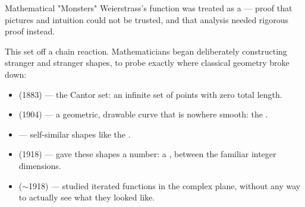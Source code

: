 \begin{frame}{Mathematical "Monsters"}
  \small
  Weierstrass's function was treated as a  — proof that pictures and intuition could not be trusted,
  and that analysis needed rigorous proof instead.

  \vspace{0.2cm}
  \pause
  This set off a chain reaction. Mathematicians began deliberately
  constructing stranger and stranger shapes, to probe exactly where
  classical geometry broke down:

  \begin{itemize}
    \item<3->  (1883) — the Cantor set: an
      infinite set of points with zero total length.
    \item<4->  (1904) — a geometric,
      drawable curve that is nowhere smooth: the .
    \item<5->  — self-similar shapes
      like the .
    \item<6->  (1918) — gave these shapes a
      number: a , between the familiar
      integer dimensions.
    \item<7->  ($\sim$1918) —
      studied iterated functions in the complex plane, without any way
      to actually see what they looked like.
  \end{itemize}

  \pause[8]
  \vspace{0.2cm}
  \begin{center}
  \end{center}
\end{frame}

